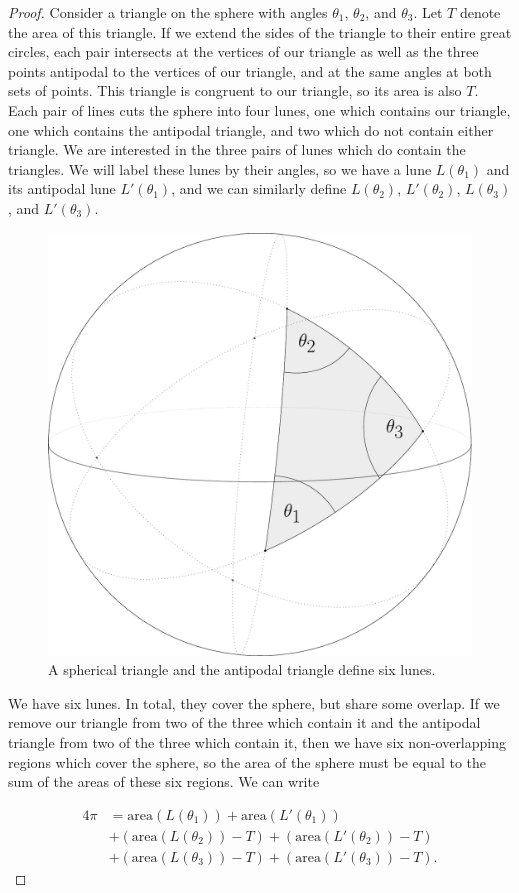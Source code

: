 \begin{proof}
	Consider a triangle on the sphere with angles $\theta_1$, $\theta_2$, and $\theta_3$.  Let $T$ denote the area of this triangle. If we extend the sides of the triangle to their entire great circles, each pair intersects at the vertices of our triangle as well as the three points antipodal to the vertices of our triangle, and at the same angles at both sets of points.  This triangle is congruent to our triangle, so its area is also $T$.  Each pair of lines cuts the sphere into four lunes, one which contains our triangle, one which contains the antipodal triangle, and two which do not contain either triangle.  We are interested in the three pairs of lunes which do contain the triangles.  We will label these lunes by their angles, so we have a lune $L(\theta_1)$ and its antipodal lune $L'(\theta_1)$, and we can similarly define $L(\theta_2)$, $L'(\theta_2)$, $L(\theta_3)$, and $L'(\theta_3)$.
	
	
	\begin{figure}[htb]
		\centering
		\includegraphics[width=.35\textwidth]{figs/trilune.pdf}
		\caption{A spherical triangle and the antipodal triangle define six lunes.}
		\label{fig:trilune}
	\end{figure}
	
	
	We have six lunes.  In total, they cover the sphere, but share some overlap.  If we remove our triangle from two of the three which contain it and the antipodal triangle from two of the three which contain it, then we have six non-overlapping regions which cover the sphere, so the area of the sphere must be equal to the sum of the areas of these six regions.  We can write
	
	\begin{align*}
	4\pi &= \mathrm{area}(L(\theta_1)) + \mathrm{area}(L'(\theta_1)) \\
	&+  (\mathrm{area}(L(\theta_2)) - T) + (\mathrm{area}(L'(\theta_2)) - T) \\
	&+ (\mathrm{area}(L(\theta_3)) - T)	 + (\mathrm{area}(L'(\theta_3)) - T).
	\end{align*}
	

\end{proof}
